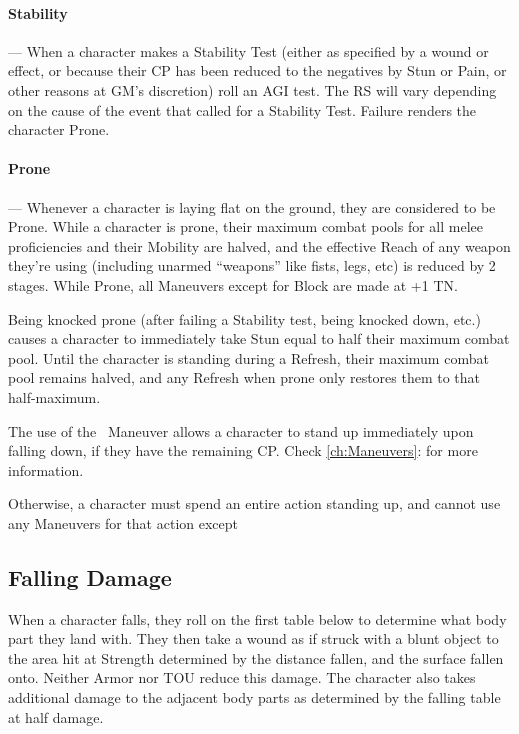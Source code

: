 \documentclass[oneside,11pt,english]{book}
\begin{document}
\paragraph{\label{par:Stability}Stability}---\quad
When a character makes a Stability Test (either as specified by a wound or effect, or because their CP has been reduced to the negatives by Stun or Pain, or other reasons at GM’s discretion) roll an AGI test. The RS will vary depending on the cause of the event that called for a Stability Test. Failure renders the character Prone.

\paragraph{\label{par:Prone}Prone}---\quad
Whenever a character is laying flat on the ground, they are considered to be Prone. While a character is prone, their maximum combat pools for all melee proficiencies and their Mobility are halved, and the effective Reach of any weapon they’re using (including unarmed “weapons” like fists, legs, etc) is reduced by 2 stages. While Prone, all Maneuvers except for Block are made at +1 TN.

Being knocked prone (after failing a Stability test, being knocked down, etc.) causes a character to immediately take Stun equal to half their maximum combat pool. Until the character is standing during a Refresh, their maximum combat pool remains halved, and any Refresh when prone only restores them to that half-maximum.

The use of the ~Maneuver allows a character to stand up immediately upon falling down, if they have the remaining CP. Check \autoref{ch:Maneuvers}:  for more information. 

Otherwise, a character must spend an entire action standing up, and cannot use any Maneuvers for that action except 

\subsection{Falling Damage}\label{sec:falling-damage}
When a character falls, they roll on the first table below to determine what body part they land with. They then take a wound as if struck with a blunt object to the area hit at Strength determined by the distance fallen, and the surface fallen onto. Neither Armor nor TOU reduce this damage. The character also takes additional damage to the adjacent body parts as determined by the falling table at half damage.
\end{document}

